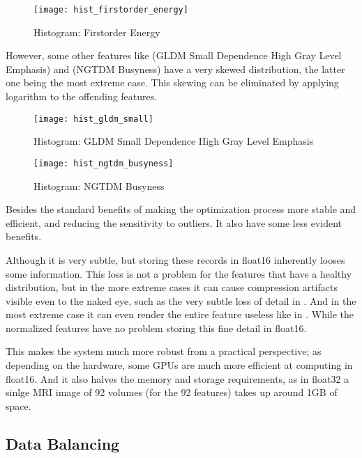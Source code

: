 \begin{figure}[H]
\centering
\texttt{[image: hist\_firstorder\_energy]}
\caption{Histogram: Firstorder Energy}
\label{fig:hist_fie}
\end{figure}

However, some other features like  (GLDM Small Dependence High Gray Level Emphasis) and  (NGTDM Busyness) have a very skewed distribution, the latter one being the most extreme case. This skewing can be eliminated by applying logarithm to the offending features.

\begin{figure}[H]
\centering
\texttt{[image: hist\_gldm\_small]}
\caption{Histogram: GLDM Small Dependence High Gray Level Emphasis}
\label{fig:hist_gls}
\end{figure}

\begin{figure}[H]
\centering
\texttt{[image: hist\_ngtdm\_busyness]}
\caption{Histogram: NGTDM Busyness}
\label{fig:hist_ngb}
\end{figure}

Besides the standard benefits of making the optimization process more stable and efficient, and reducing the sensitivity to outliers. It also have some less evident benefits.\par
Although it is very subtle, but storing these records in float16 inherently looses some information. This loss is not a problem for the features that have a healthy distribution, but in the more extreme cases it can cause compression artifacts visible even to the naked eye, such as the very subtle loss of detail in . And in the most extreme case it can even render the entire feature useless like in . While the normalized features have no problem storing this fine detail in float16.\par
This makes the system much more robust from a practical perspective; as depending on the hardware, some GPUs are much more efficient at computing in float16. And it also halves the memory and storage requirements, as in float32 a sinlge MRI image of 92 volumes (for the 92 features) takes up around 1GB of space.

\subsection{Data Balancing}

